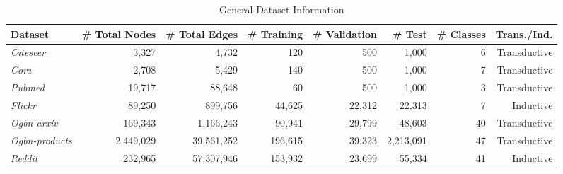 \begin{table*}[ht]
\centering
\caption{General Dataset Information}
\label{tab:statistics}
\begin{tabular}{lrrrrrrr}
\toprule
\textbf{Dataset} & 
\textbf{\# Total Nodes} & 
\textbf{\# Total Edges} & 
\textbf{\# Training} & 
\textbf{\# Validation} & 
\textbf{\# Test} & 
\textbf{\# Classes} & 
\textbf{Trans./Ind.} \\
\midrule
\textit{Citeseer}      & 3{,}327     & 4{,}732        & 120      & 500       & 1{,}000   & 6  & Transductive \\
\textit{Cora}          & 2{,}708     & 5{,}429        & 140      & 500       & 1{,}000   & 7  & Transductive \\
\textit{Pubmed}        & 19{,}717    & 88{,}648       & 60       & 500       & 1{,}000   & 3  & Transductive \\
\textit{Flickr}        & 89{,}250    & 899{,}756      & 44{,}625 & 22{,}312  & 22{,}313  & 7  & Inductive    \\ \midrule
\textit{Ogbn-arxiv}    & 169{,}343   & 1{,}166{,}243  & 90{,}941 & 29{,}799  & 48{,}603  & 40 & Transductive \\
\textit{Ogbn-products} & 2{,}449{,}029 & 39{,}561{,}252 & 196{,}615 & 39{,}323 & 2{,}213{,}091 & 47 & Transductive \\
\textit{Reddit}        & 232{,}965   & 57{,}307{,}946 & 153{,}932 & 23{,}699  & 55{,}334  & 41 & Inductive    \\
\bottomrule
\end{tabular}
\end{table*}